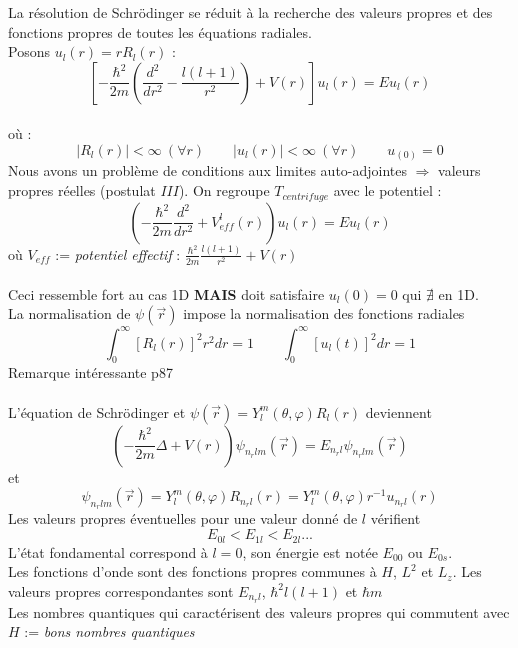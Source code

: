 \documentclass[british,french,11pt, a4paper, openany]{book}
\begin{document}
La résolution de Schrödinger se réduit à la recherche des valeurs propres et des fonctions propres de toutes les équations radiales.\\
Posons $u_l(r)=rR_l(r)$ : \begin{equation}
	\left[-\frac{\hbar^2}{2m}\left(\frac{d^2}{dr^2}-\frac{l(l+1)}{r^2}\right)+V(r)\right]u_l(r)=Eu_l(r)
\end{equation}
\ \\
où : 
\begin{equation}
	|R_l(r)|<\infty\ (\forall r)\qquad
	|u_l(r)|<\infty\ (\forall r)\qquad
	u_(0)=0
\end{equation}
Nous avons un problème de conditions aux limites auto-adjointes $\Rightarrow$ valeurs propres réelles (postulat $III$). On regroupe $T_{centrifuge}$ avec le potentiel : \begin{equation}\label{eq:6.14}
	\left(-\frac{\hbar^2}{2m}\frac{d^2}{dr^2}+V^l_{eff}(r)\right)u_l(r)=Eu_l(r)
\end{equation}
où $V_{eff}$ := \textit{potentiel effectif} : $\frac{\hbar^2}{2m}\frac{l(l+1)}{r^2}+V(r)$\\\\
Ceci ressemble fort au cas 1D \textbf{MAIS} doit satisfaire $u_l(0)=0$ qui $\nexists$ en 1D.\\
La normalisation de $\psi(\vec r)$ impose la normalisation des fonctions radiales $$\int_0^{\infty}[R_l(r)]^2r^2dr=1\qquad\int_0^{\infty}[u_l(t)]^2dr=1$$Remarque intéressante p87\\\\
L'équation de Schrödinger et $\psi(\vec r)=Y^m_l(\theta,\varphi)R_l(r)$ deviennent \begin{equation}
	\left(-\frac{\hbar^2}{2m}\Delta+V(r)\right)\psi_{n_rlm}(\vec r)=E_{n_rl}\psi_{n_rlm}(\vec r)
\end{equation}
et
\begin{equation}
	\psi_{n_rlm}(\vec r)=Y^m_l(\theta,\varphi)R_{n_rl}(r)=Y_l^m(\theta,\varphi)r^{-1}u_{n_rl}(r)
\end{equation}
Les valeurs propres éventuelles pour une valeur donné de $l$ vérifient \begin{equation}
	E_{0l}<E_{1l}<E_{2l}...
\end{equation}
L'état fondamental correspond à $l=0$, son énergie est notée $E_{00}$ ou $E_{0s}$.\\

Les fonctions d'onde sont des fonctions propres communes à $H$, $L^2$ et $L_z$. Les valeurs propres correspondantes sont $E_{n_rl}$, $\hbar^2l(l+1)$ et $\hbar m$\\
Les nombres quantiques qui caractérisent des valeurs propres qui commutent avec $H$ := \textit{bons nombres quantiques}
\end{document}
